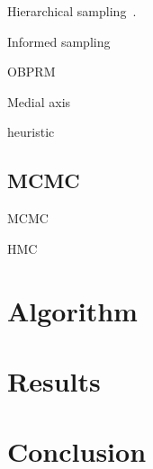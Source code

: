 \documentclass[letterpaper, 10 pt, conference]{ieeeconf}  %
\begin{document}
Hierarchical sampling~\cite{KTC16}.

Informed sampling~\cite{GSB14}

OBPRM~\cite{ABDJV98, YTEA12}

Medial axis~\cite{LTA03, YDLTA14}

heuristic~\cite{US03, SWT09}

\subsection{MCMC}

MCMC~\cite{ADDJ03}

HMC~\cite{N11}

\section{Algorithm}


\section{Results}


\section{Conclusion}








%
\end{document}
